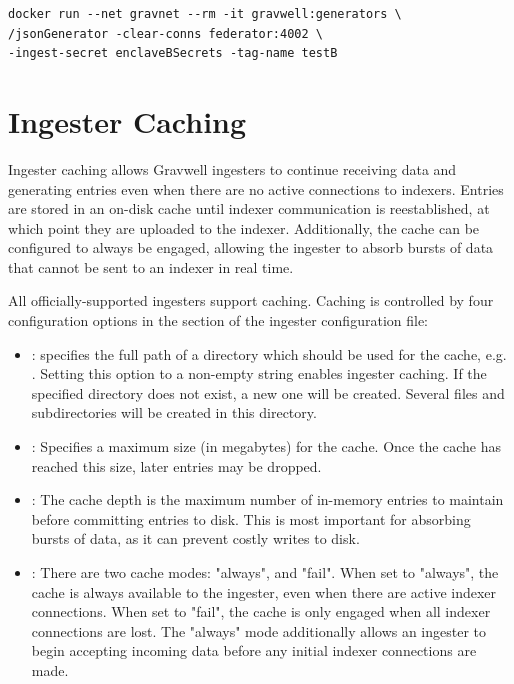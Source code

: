 \begin{Verbatim}[breaklines=true]
docker run --net gravnet --rm -it gravwell:generators \
/jsonGenerator -clear-conns federator:4002 \
-ingest-secret enclaveBSecrets -tag-name testB
\end{Verbatim}

\section{Ingester Caching}
Ingester caching allows Gravwell ingesters to continue receiving data
and generating entries even when there are no active connections to
indexers. Entries are stored in an on-disk cache until indexer
communication is reestablished, at which point they are uploaded to the
indexer. Additionally, the cache can be configured to always be engaged,
allowing the ingester to absorb bursts of data that cannot be sent to an
indexer in real time.

All officially-supported ingesters support caching. Caching is
controlled by four configuration options in the \code{[Global]} section of
the ingester configuration file:

\begin{itemize}
\item
  : specifies the full path of a directory which should
  be used for the cache, e.g.
  \code{/opt/gravwell/cache/file\_follow}. Setting this option to a
  non-empty string enables ingester caching. If the specified directory does
  not exist, a new one will be created. Several files and
  subdirectories will be created in this directory.
\item
  : Specifies a maximum size (in megabytes) for the
  cache. Once the cache has reached this size, later entries may be
  dropped.
\item
  : The cache depth is the maximum number of in-memory
  entries to maintain before committing entries to disk. This is
  most important for absorbing bursts of data, as it can prevent
  costly writes to disk.
\item
  : There are two cache modes: "always", and "fail". When set
  to "always", the cache is always available to the ingester,
  even when there are active indexer connections. When set to
  "fail", the cache is only engaged when all indexer connections
  are lost. The "always" mode additionally allows an ingester to begin
  accepting incoming data before any initial indexer connections
  are made.
\end{itemize}

